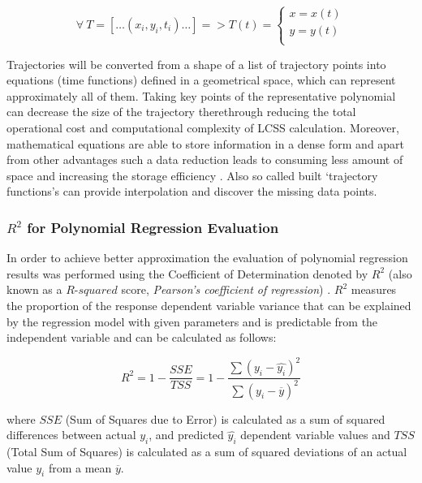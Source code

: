 \begin{equation}\label{eq:regr-func}
	\forall\ T = [\ldots (x_i, y_i, t_i) \ldots] = > T(t) = 
		\begin{cases}
			x = x(t) \\
			y = y(t) \\
		\end{cases}
\end{equation}

Trajectories will be converted from a shape of a list of trajectory points into equations (time functions) defined in a geometrical space, which can represent approximately all of them. Taking key points of the representative polynomial can decrease the size of the trajectory therethrough reducing the total operational cost and computational complexity of LCSS calculation. Moreover, mathematical equations are able to store information in a dense form and apart from other advantages such a data reduction leads to consuming less amount of space and increasing the storage efficiency \cite{article:behav_form_extr}. Also so called built `trajectory functions's can provide interpolation and discover the missing data points.

\bigbreak

\subsubsection{$R^2$ for Polynomial Regression Evaluation}

In order to achieve better approximation the evaluation of polynomial regression results was performed using the Coefficient of Determination denoted by $R^2$ (also known as a $R$-$squared$ score, \textit{Pearson's coefficient of regression}) \cite{inbook:stats}. $R^2$ measures the proportion of the response dependent variable variance that can be explained by the regression model with given parameters and is predictable from the independent variable and can be calculated as follows: 

\begin{equation}\label{eq:r_sq}
	R^2 = 1 - \frac{SSE}{TSS} = 1 - \frac{\sum{(y_i - \hat{y_i})^2}}{\sum{(y_i - \overline{y})^2}}
\end{equation}

where $SSE$ (Sum of Squares due to Error) is calculated as a sum of squared differences between actual $y_i$, and predicted $\hat{y_i}$ dependent variable values and $TSS$ (Total Sum of Squares) is calculated as a sum of squared deviations of an actual value $y_i$ from a mean $\overline{y}$.

